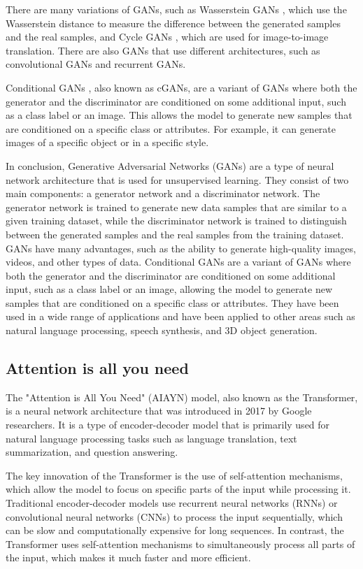 There are many variations of GANs, such as Wasserstein GANs \cite{arxiv.1701.07875}, which use the Wasserstein distance to measure the difference between the generated samples and the real samples, and Cycle GANs \cite{CycleGAN2017}, which are used for image-to-image translation.
There are also GANs that use different architectures, such as convolutional GANs and recurrent GANs.

Conditional GANs \cite{arxiv.1411.1784}, also known as cGANs, are a variant of GANs where both the generator and the discriminator are conditioned on some additional input, such as a class label or an image.
This allows the model to generate new samples that are conditioned on a specific class or attributes.
For example, it can generate images of a specific object or in a specific style.

In conclusion, Generative Adversarial Networks (GANs) are a type of neural network architecture that is used for unsupervised learning.
They consist of two main components: a generator network and a discriminator network.
The generator network is trained to generate new data samples that are similar to a given training dataset, while the discriminator network is trained to distinguish between the generated samples and the real samples from the training dataset.
GANs have many advantages, such as the ability to generate high-quality images, videos, and other types of data.
Conditional GANs are a variant of GANs where both the generator and the discriminator are conditioned on some additional input, such as a class label or an image, allowing the model to generate new samples that are conditioned on a specific class or attributes.
They have been used in a wide range of applications and have been applied to other areas such as natural language processing, speech synthesis, and 3D object generation.

\subsection{Attention is all you need}

The "Attention is All You Need" (AIAYN) \cite{vaswani} model, also known as the Transformer, is a neural network architecture that was introduced in 2017 by Google researchers.
It is a type of encoder-decoder model that is primarily used for natural language processing tasks such as language translation, text summarization, and question answering.

The key innovation of the Transformer is the use of self-attention mechanisms, which allow the model to focus on specific parts of the input while processing it.
Traditional encoder-decoder models use recurrent neural networks (RNNs) or convolutional neural networks (CNNs) to process the input sequentially, which can be slow and computationally expensive for long sequences.
In contrast, the Transformer uses self-attention mechanisms to simultaneously process all parts of the input, which makes it much faster and more efficient.

